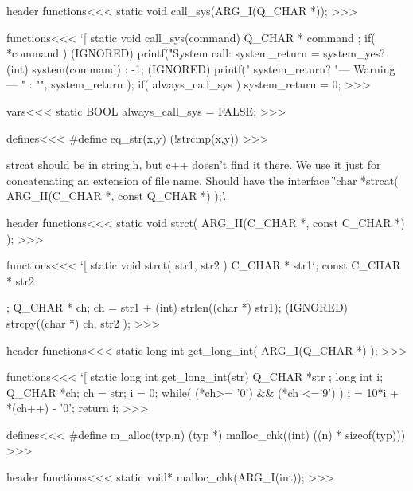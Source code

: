 {{{{{{{\<header functions\><<<
static void call_sys(ARG_I(Q_CHAR *));
>>>




\<functions\><<<
`[
static void call_sys(command)  Q_CHAR * command
;{
   if( *command ){
      (IGNORED) printf("System call: %
      system_return = system_yes?  (int) system(command) : -1;
      (IGNORED) printf("%
            system_return? "--- Warning --- " : "", system_return );
      if( always_call_sys ){ system_return = 0; }
   }
}
>>>


\<vars\><<<
static BOOL always_call_sys = FALSE;
>>>




\<defines\><<<
#define eq_str(x,y) (!strcmp(x,y))
>>>



strcat should be in string.h, but c++ doesn't find it there.
We use it just for concatenating an extension of 
file name. Should have the interface
\`'char *strcat( ARG_II(C_CHAR *, const Q_CHAR *) );'.

\<header functions\><<<
static void strct( ARG_II(C_CHAR *, const C_CHAR *) );
>>>

\<functions\><<<
`[
static void strct( str1, str2 ) 
     C_CHAR * str1`;
     const C_CHAR * str2

;{   Q_CHAR * ch;
   ch = str1 + (int) strlen((char *) str1);
   (IGNORED) strcpy((char *)  ch, str2 );
}
>>>




\<header functions\><<<
static long int get_long_int( ARG_I(Q_CHAR *) );
>>>

\<functions\><<<
`[
static long int get_long_int(str)     
                         Q_CHAR   *str
;{                  long int    i;
                         Q_CHAR   *ch;
   ch = str;   i = 0;
   while( (*ch>= '0') && (*ch <='9') ){
     i = 10*i + *(ch++) - '0';
   }
   return i;
}
>>>





\<defines\><<<
#define m_alloc(typ,n) (typ *) malloc_chk((int) ((n) * sizeof(typ)))
>>>



\<header functions\><<<
static void* malloc_chk(ARG_I(int));
>>>

}}}}}}}
